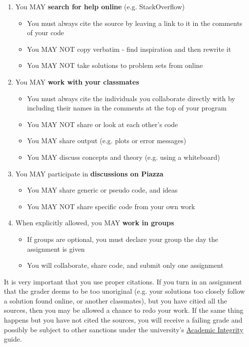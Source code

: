 \documentclass{article}
\begin{document}
\begin{enumerate}
	\item You MAY \textbf{search for help online} (e.g. StackOverflow)
	\begin{itemize}
		\item You must always cite the source by leaving a link to it in the comments of your code
		\item You MAY NOT copy verbatim - find inspiration and then rewrite it
		\item You MAY NOT take solutions to problem sets from online
	\end{itemize}
	\item You MAY \textbf{work with your classmates}
	\begin{itemize}
		\item You must always cite the individuals you collaborate directly with by including their names in the comments at the top of your program
		\item You MAY NOT share or look at each other's code
		\item You MAY share output (e.g. plots or error messages)
		\item You MAY discuss concepts and theory (e.g. using a whiteboard)
	\end{itemize}
	\item You MAY participate in \textbf{discussions on Piazza}
	\begin{itemize}
		\item You MAY share generic or pseudo code, and ideas
		\item You MAY NOT share specific code from your own work
	\end{itemize}
	\item When explicitly allowed, you MAY \textbf{work in groups}
	\begin{itemize}
		\item If groups are optional, you must declare your group the day the assignment is given
		\item You will collaborate, share code, and submit only one assignment
	\end{itemize}
\end{enumerate}

It is very important that you use proper citations.  If you turn in an assignment that the grader deems to be too unoriginal (e.g. your solutions too closely follow a solution found online, or another classmates), but you have citied all the sources, then you may be allowed a chance to redo your work.  If the same thing happens but you have not cited the sources, you will receive a failing grade and possibly be subject to other sanctions under the university's \href{https://college.uchicago.edu/advising/academic-integrity-student-conduct}{Academic Integrity} guide.
\end{document}
